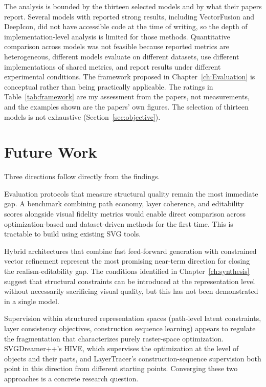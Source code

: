 The analysis is bounded by the thirteen selected 
models and by what their papers report. Several models 
with reported strong results, including VectorFusion 
and DeepIcon, did not have accessible code at the time 
of writing, so the depth of implementation-level analysis 
is limited for those methods. Quantitative comparison across models was not 
feasible because reported metrics are heterogeneous,
different models evaluate on different datasets, use 
different implementations of shared metrics, and report 
results under different experimental conditions. The framework proposed in 
Chapter~\ref{ch:Evaluation} is conceptual rather than 
being practically applicable. The ratings in 
Table~\ref{tab:framework} are my assessment from the papers, 
not measurements, and the examples shown are the papers' own 
figures. The selection of thirteen models is not exhaustive 
(Section~\ref{sec:objective}).


\section{Future Work}

Three directions follow directly from the findings.

Evaluation protocols that measure structural 
quality remain the most immediate gap. A benchmark 
combining path economy, layer coherence, and editability 
scores alongside visual fidelity metrics would enable 
direct comparison across optimization-based and 
dataset-driven methods for the first time. This is 
tractable to build using existing SVG tools.

Hybrid architectures that combine fast feed-forward 
generation with constrained vector refinement represent 
the most promising near-term direction for closing the 
realism-editability gap. The conditions identified in 
Chapter~\ref{ch:synthesis} suggest that structural 
constraints can be introduced at the representation 
level without necessarily sacrificing visual quality, 
but this has not been demonstrated in a single model.

Supervision within structured representation spaces 
(path-level latent constraints, layer consistency 
objectives, construction sequence learning) appears to 
regulate the fragmentation that characterizes purely 
raster-space optimization. SVGDreamer++'s HIVE, which 
supervises the optimization at the level of objects and 
their parts, and LayerTracer's construction-sequence supervision 
both point in this direction from different starting 
points. Converging these two approaches is a concrete 
research question.




